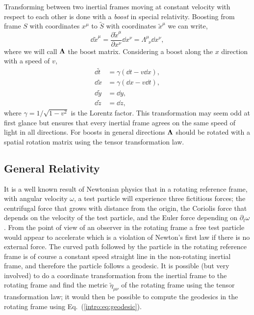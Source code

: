 Transforming between two inertial frames moving at constant velocity with respect to each other is done with a {\it boost} in special relativity. Boosting from frame $S$ with coordinates $x^\mu$ to $\tilde{S}$ with coordinates $\tilde{x}^\mu$ we can write, 
\begin{equation}
\dd \tilde{x}^\mu = \frac{\partial \tilde{x}^\mu}{\partial x^\nu} \dd x^\nu = \Lambda^\mu_{\,\,\,\nu} \dd x^\nu,
\end{equation}
where we will call $\boldsymbol{\Lambda}$ the boost matrix. Considering a boost along the $x$ direction with a speed of $v$,
\begin{align}
\dd \tilde{t} &= \gamma (\dd t-v\dd x), \\ 
\dd \tilde{x} &= \gamma (\dd x-v\dd t), \\ 
\dd \tilde{y} &= \dd y, \\ 
\dd \tilde{z} &= \dd z,  
\end{align} 
where $\gamma = 1/\sqrt{1-v^2}$ is the Lorentz factor. This transformation may seem odd at first glance but ensures that every inertial frame agrees on the same speed of light in all directions. For boosts in general directions $\boldsymbol{\Lambda}$ should be rotated with a spatial rotation matrix using the tensor transformation law.



\subsection{General Relativity}

It is a well known result of Newtonian physics that in a rotating reference frame, with angular velocity $\omega$, a test particle will experience three fictitious forces; the centrifugal force that grows with distance from the origin, the Coriolis force that depends on the velocity of the test particle, and the Euler force depending on $\partial_t \omega$. From the point of view of an observer in the rotating frame a free test particle would appear to accelerate which is a violation of Newton's first law if there is no external force. The curved path followed by the particle in the rotating reference frame is of course a constant speed straight line in the non-rotating inertial frame, and therefore the particle follows a geodesic. It is possible (but very involved) to do a coordinate transformation from the inertial frame to the rotating frame and find the metric $\tilde{\eta}_{\mu\nu}$ of the rotating frame using the tensor transformation law; it would then be possible to compute the geodesics in the rotating frame using Eq.~(\ref{intro:eq:geodesic}).

